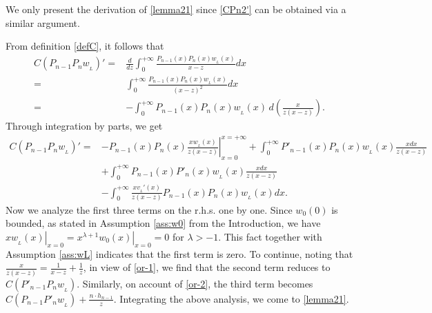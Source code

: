 \documentclass[12pt,a4paper]{article}    %
\makeatletter
\renewenvironment{proof}[1][\proofname]{\par
	\pushQED{\qed}%
	\normalfont \topsep6\p@\@plus6\p@\relax
	\trivlist
	\item[\hskip\labelsep
	\itshape #1\@addpunct{.}]\ignorespaces
}{%
	\popQED\endtrivlist\@endpefalse
}
\numberwithin{equation}{section}
\makeatother
\begin{document}
\begin{proof}
We only present the derivation of \eqref{lemma21} since \eqref{CPn2'} can be obtained via a similar argument.

From definition \eqref{defC}, it follows that		
\begin{align}
C(P_{n-1}P_{n}w_{_L})'=& \frac{d}{dz}\int_{0}^{+\infty}\frac {P_{n-1}(x)P_{n}(x)w_{_L}(x)}{x-z}dx\nonumber\\
=&\int_{0}^{+\infty}\frac{P_{n-1}(x)P_{n}(x)w_{_L}(x)}{(x-z)^{2}}dx\nonumber\\
=&-\int_{0}^{+\infty}P_{n-1}(x)P_{n}(x)w_{_L}(x)\,d\left(\frac{x}{z(x-z)}\right).\label{L-C-d}
\end{align}	
Through integration by parts, we get
\begin{align}		 C(P_{n-1}P_{n}w_{_L})'=&-\left.P_{n-1}(x)P_{n}(x)\frac{x w_{_L}(x)}{z(x-z)}\right|_{x=0}^{x=+\infty}
+\int_{0}^{+\infty}P'_{n-1}(x)P_{n}(x)w_{_L}(x)\frac{x dx}{z(x-z)}\nonumber\\			 &+\int_{0}^{+\infty}P_{n-1}(x)P'_{n}(x)w_{_L}(x)\frac{x dx}{z(x-z)}\nonumber\\
&-\int_{0}^{+\infty}\frac{x v_{_L}'(x)}{z(x-z)}P_{n-1}(x)P_{n}(x)w_{_L}(x)dx.\label{L-C-ibp}
\end{align}	
Now we analyze the first three terms on the r.h.s. one by one. Since $w_0(0)$ is bounded, as stated in Assumption \ref{ass:w0} from the Introduction, we have $\left.xw_{_L}(x)\right|_{x=0}=\left.x^{\lambda+1}w_0(x)\right|_{x=0}=0$ for $\lambda>-1$.  This fact together with Assumption \ref{ass:wL} indicates that the first term is zero. To continue, noting that
$\frac{x}{z(x-z)}=\frac{1}{x-z}+\frac{1}{z}$,
in view of \eqref{or-1}, we find that the second term reduces to $C(P'_{n-1}P_{n}w_{_L})$.
Similarly, on account of \eqref{or-2}, the third term becomes $C(P_{n-1}P'_{n}w_{_L})+\frac{n\cdot h_{n-1}}{z}$.
Integrating the above analysis, we  come to \eqref{lemma21}.
	\end{proof}	
\end{document}
